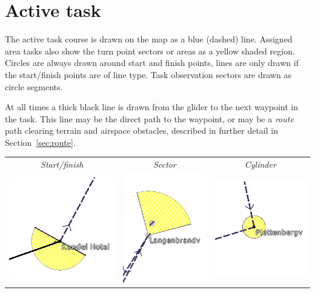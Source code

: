 \section{Active task}

The active task course is drawn on the map as a blue (dashed) line.
Assigned area tasks also show the turn point sectors or areas as a yellow shaded
region.  
Circles are always drawn around start and finish points, lines are
only drawn if the start/finish points are of line type.  Task
observation sectors are drawn as circle segments.

At all times a thick black line is drawn from the glider to the next
waypoint in the task.  This line may be the direct path to the waypoint,
or may be a {\em route} path clearing terrain and airspace obstacles, described in
further detail in Section~\ref{sec:route}.

\begin{center}
\begin{tabular}{c c c}
{\it Start/finish} & {\it Sector} & {\it Cylinder} \\
\includegraphics[angle=0,width=0.3\linewidth,keepaspectratio='true']{figures/cut-startfinish.png} &
\includegraphics[angle=0,width=0.3\linewidth,keepaspectratio='true']{figures/cut-sector.png} &
\includegraphics[angle=0,width=0.3\linewidth,keepaspectratio='true']{figures/cut-barrel.png} \\
\end{tabular}
\end{center}


